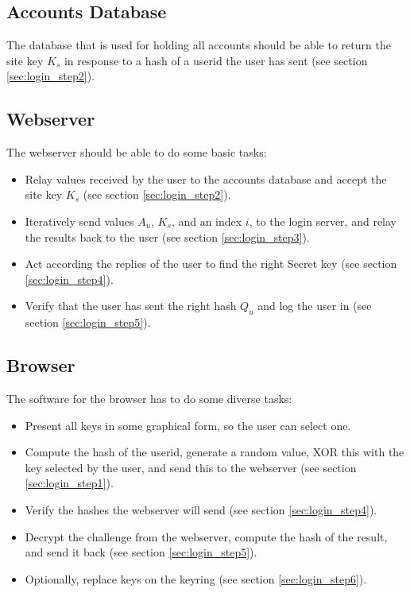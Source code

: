 \subsection{Accounts Database}
The database that is used for holding all accounts should be able to return the site key $K_s$ in response to a \SHA hash of a userid the user has sent (see section \ref{sec:login_step2}).

\subsection{Webserver}
The webserver should be able to do some basic tasks:
\begin{itemize}
\item Relay values received by the user to the accounts database and accept the site key $K_s$ (see section \ref{sec:login_step2}).
\item Iteratively send values $A_u$, $K_s$, and an index $i$, to the login server, and relay the results back to the user (see section \ref{sec:login_step3}).
\item Act according the replies of the user to find the right Secret key (see section \ref{sec:login_step4}).
\item Verify that the user has sent the right hash $Q_u$ and log the user in (see section \ref{sec:login_step5}).
\end{itemize}

\subsection{Browser}
The software for the browser has to do some diverse tasks:
\begin{itemize}
\item Present all keys in some graphical form, so the user can select one.
\item Compute the \SHA hash of the userid,
generate a random value,
XOR this with the key selected by the user,
and send this to the webserver (see section \ref{sec:login_step1}).
\item Verify the \SHA hashes the webserver will send (see section \ref{sec:login_step4}).
\item Decrypt the challenge from the webserver,
compute the \SHA hash of the result,
and send it back (see section \ref{sec:login_step5}).
\item Optionally, replace keys on the keyring (see section \ref{sec:login_step6}).
\end{itemize}
